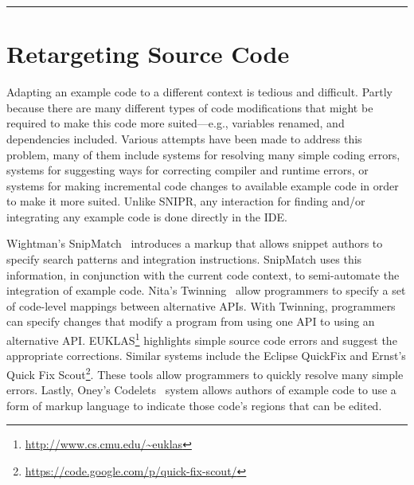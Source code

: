 \fancybreak{\pfbreakdisplay}

\section{Retargeting Source Code}
\label{sec:retargetingcode}

Adapting an example code to a different context is tedious and difficult. Partly because there are many different types of code modifications that might be required to make this code more suited---e.g., variables renamed, and dependencies included. Various attempts have been made to address this problem, many of them include systems for resolving many simple coding errors, systems for suggesting ways for correcting compiler and runtime errors, or systems for making incremental code changes to available example code in order to make it more suited. Unlike \uppercase{SnipR}, any interaction for finding and/or integrating any example code is done directly in the IDE.  

Wightman's SnipMatch~\cite{Wightman:2012gc} introduces a markup that allows snippet authors to specify search patterns and integration instructions. SnipMatch uses this information, in conjunction with the current code context, to semi-automate the integration of example code. Nita's Twinning~\cite{Nita:2010en} allow programmers to specify a set of code-level mappings between alternative APIs. With Twinning, programmers can specify changes that modify a program from using one API to using an alternative API. EUKLAS\footnote{\url{http://www.cs.cmu.edu/~euklas}} highlights simple source code errors and suggest the appropriate corrections. Similar systems include the Eclipse QuickFix and Ernst's Quick Fix Scout\footnote{\url{https://code.google.com/p/quick-fix-scout/}}. These tools allow programmers to quickly resolve many simple errors. Lastly, Oney's Codelets~\cite{Oney:2012ge} system allows authors of example code to use a form of markup language to indicate those code's regions that can be edited.

